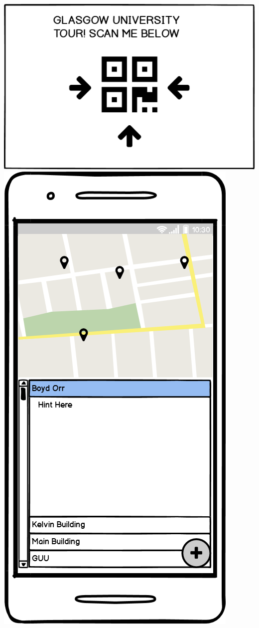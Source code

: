 \documentclass[a4,10pt,twocolumn]{article}
\begin{document}
\noindent\includegraphics[width=0.6\columnwidth]{refinedPrototype3.png}
\noindent\includegraphics[width=0.6\columnwidth]{refinedPrototype4.png}
\end{document}
